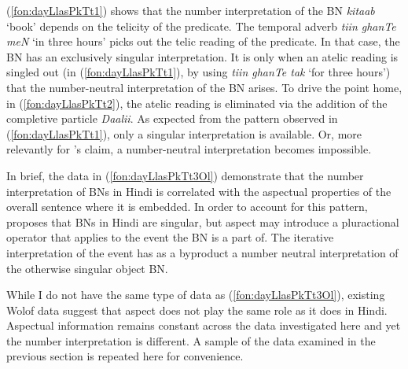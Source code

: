 \documentclass[output=paper]{langscibook}
\begin{document}
\noindent   (\ref{fon:dayLlasPkTt1}) shows that the number interpretation of the BN \textit{kitaab} `book' depends on the telicity of the predicate. The temporal adverb \textit{tiin ghanTe meN} `in three hours' picks out the telic reading of the predicate. In that case, the BN has an exclusively singular interpretation. It is only when an atelic reading is singled out (in (\ref{fon:dayLlasPkTt1}), by using \textit{tiin ghanTe tak} `for three hours') that the number-neutral interpretation of the BN arises. To drive the point home, in (\ref{fon:dayLlasPkTt2}), the atelic reading is eliminated via the addition of the completive particle \textit{Daalii}. As expected from the pattern observed in (\ref{fon:dayLlasPkTt1}), only a singular interpretation is available. Or, more relevantly for \citeauthor{dayal2011hindi}'s claim, a number-neutral interpretation becomes impossible.
			
In brief, the data in (\ref{fon:dayLlasPkTt3Ol}) demonstrate that the number interpretation of BNs in Hindi is correlated with the aspectual properties of the overall sentence where it is embedded. In order to account for this pattern, \citeauthor{dayal2011hindi} proposes that BNs in Hindi are singular, but aspect may introduce a pluractional operator that applies to the event the BN is a part of. The iterative interpretation of the event has as a byproduct a number neutral interpretation of the otherwise singular object BN.

While I do not have the same type of data as (\ref{fon:dayLlasPkTt3Ol}), existing Wolof data suggest that aspect does not play the same role as it does in Hindi. Aspectual information remains constant across the data investigated here and yet the number interpretation is different. A sample of the data examined in the previous section is repeated here for convenience.\largerpage
		
		\ea
			\z
		\z
		
\end{document}
